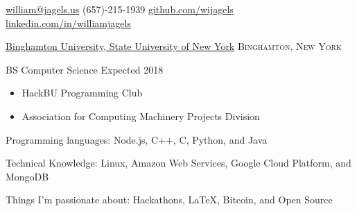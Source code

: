 \documentclass[11pt]{article}
\begin{document}


\nobreakvspace{0.3em}  %

\href{mailto:william@jagels.us}{william@jagels.us}\sbull
(657)-215-1939\sbull
\href{https://github.com/wijagels}{github.com/wijagels}\sbull
\href{https://www.linkedin.com/in/williamjagels}{linkedin.com/in/williamjagels}



\spacedhrule{0.1em}{0.9em}  %

\headedsection
{\href{http://www.binghamton.edu/index.php}{Binghamton University, State University of New York}}
{\textsc{Binghamton, New York}} {
    \headedsubsection
    {BS Computer Science}
    {Expected 2018}
    {
        \begin{itemize}
            \item HackBU Programming Club
            \item Association for Computing Machinery Projects Division
        \end{itemize}
    }
}



\spacedhrule{0.1em}{0.9em}  %

\inlineheadsection  %
{Programming languages:}
{ Node.js, C++, C, Python, and Java }


\inlineheadsection
{Technical Knowledge:}
{ Linux, Amazon Web Services, Google Cloud Platform, and MongoDB}

\inlineheadsection
{Things I'm passionate about:}
{Hackathons, \LaTeX, Bitcoin, and Open Source}




\spacedhrule{0.1em}{0.9em}  %
\end{document}
